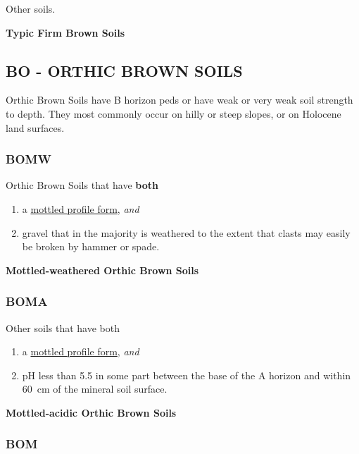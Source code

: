 \documentclass[
  letterpaper,
  DIV=11,
  numbers=noendperiod]{scrreprt}
\providecommand{\tightlist}{%
  \setlength{\itemsep}{0pt}\setlength{\parskip}{0pt}}\usepackage{longtable,booktabs,array}
\begin{document}
Other soils.

\textbf{Typic Firm Brown Soils}

\hypertarget{sec-BO}{%
\subsection{\texorpdfstring{\textbf{BO} - ORTHIC BROWN
SOILS}{BO - ORTHIC BROWN SOILS}}\label{sec-BO}}

Orthic Brown Soils have B horizon peds or have weak or very weak soil
strength to depth. They most commonly occur on hilly or steep slopes, or
on Holocene land surfaces.

\hypertarget{sec-key-BOMW}{%
\subsubsection{\texorpdfstring{\textbf{BOMW}}{BOMW}}\label{sec-key-BOMW}}

Orthic Brown Soils that have \textbf{both}

\begin{enumerate}
\def\labelenumi{\arabic{enumi}.}
\tightlist
\item
  a \protect\hyperlink{sec-diag-mottpf}{mottled profile form},
  \emph{and}
\item
  gravel that in the majority is weathered to the extent that clasts may
  easily be broken by hammer or spade.
\end{enumerate}

\textbf{Mottled-weathered Orthic Brown Soils}

\hypertarget{sec-key-BOMA}{%
\subsubsection{\texorpdfstring{\textbf{BOMA}}{BOMA}}\label{sec-key-BOMA}}

Other soils that have both

\begin{enumerate}
\def\labelenumi{\arabic{enumi}.}
\tightlist
\item
  a \protect\hyperlink{sec-diag-mottpf}{mottled profile form},
  \emph{and}
\item
  pH less than 5.5 in some part between the base of the A horizon and
  within 60~cm of the mineral soil surface.
\end{enumerate}

\textbf{Mottled-acidic Orthic Brown Soils}

\hypertarget{sec-key-BOM}{%
\subsubsection{\texorpdfstring{\textbf{BOM}}{BOM}}\label{sec-key-BOM}}
\end{document}
